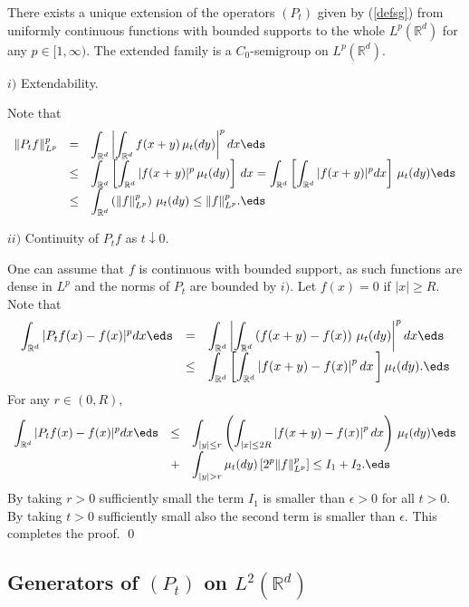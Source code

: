 \documentclass[preprint]{imsart}
\def\R{\mathbb R}
\def\ds{\displaystyle}
\begin{document}
{\begin{Proposition}
There exists a unique extension of the operators
$(P_t)$ given by (\ref{defsg}) from uniformly continuous
functions with bounded supports to the whole
$L^p(\R^d)$ for any  $p\in [1,\infty)$.
The extended family is a $C_0$-semigroup on
$L^p(\R^d)$.
\end{Proposition}


$i)$ Extendability.

\noindent Note that
$$
  \begin{array}{lll}
    \|P_tf\|^p_{L^p}&= & \ds
\int_{\R^d}\left| \int_{\R^d} f(x+y)\, \mu_t(dy)
\right|^p dx
    \eds \\
    &\leq & \ds
\int_{\R^d}\left[ \int_{\R^d} |f(x+y)|^p\, \mu_t(dy)
\right]\, dx
=\int_{\R^d}\left[ \int_{\R^d} |f(x+y)|^pdx
\right]\, \mu_t(dy)
\eds\\
 &\leq & \ds
\int_{\R^d}\left( \|f\|^p_{L^p}\right) \, \mu_t(dy)
\leq \|f\|^p_{L^p}.
\eds
  \end{array}
$$

\noindent $ii)$ Continuity of $P_tf$ as $t\downarrow 0$.

\noindent One can
assume that $f$ is continuous with bounded support, as
such functions are dense in $L^p$ and the norms of
$P_t$ are bounded by $i)$.
 Let $f(x)=0$ if $|x|\geq R$. Note that
$$
\begin{array}{lll}\ds
\int_{\R^d}|P_tf(x)-f(x)|^pdx
\eds &=&\ds
\int_{\R^d}\left| \int_{\R^d} \left(
f(x+y)-f(x)\right)\, \mu_t(dy)
\right|^p dx
\eds\\
&\leq&\ds
 \int_{\R^d}\left[ \int_{\R^d} \left|
f(x+y)-f(x)\right|^pdx \, \right] \mu_t(dy).
\eds
\end{array}
$$
For any $r\in (0,R)$,
$$
\begin{array}{lll}\ds
\int_{\R^d}|P_tf(x)-f(x)|^pdx
\eds &\leq&\ds
\int_{|y|\leq r}\left( \int_{|x|\leq 2R} \left|
f(x+y)-f(x)\right|^pdx\right)\, \mu_t(dy)
\eds\\ & +&\ds
  \int_{|y|>r}\mu_t(dy)\left[ 2^{p}
\|f\|^p_{L^p}   \right] \leq I_1+I_2.
\eds
\end{array}
$$
 By taking $r>0$ sufficiently
small the term $I_1$ is smaller than $\epsilon >0$ for
all $t>0$. By taking $t>0$ sufficiently small also the
second term is smaller than $\epsilon$. This completes
the proof.
\qed



\subsection{Generators of $(P_t)$ on $L^2(\R^d)$}

}
\end{document}
